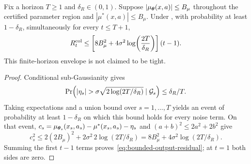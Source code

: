 \begin{lemma}
\label{lem:bounded-output-residual}
Fix a horizon $T\ge1$ and $\delta_R\in(0,1)$.  Suppose
$|\mu_{\boldsymbol{\theta}}(x,a)|\le B_\mu$ throughout the certified parameter region and
$|\mu^*(x,a)|\le B_\mu$.  Under , with probability at least
$1-\delta_R$, simultaneously for every $t\le T+1$,
\begin{equation}\label{eq:bounded-output-residual}
 R_t^{\rm col}\le
 \left[8B_\mu^2+4\sigma^2\log\!\left(\frac{2T}{\delta_R}\right)\right](t-1).
\end{equation}
This finite-horizon envelope is not claimed to be tight.
\end{lemma}
\begin{proof}
Conditional sub-Gaussianity gives
\[
 \Pr\!\left(|\eta_s|>
 \sigma\sqrt{2\log(2T/\delta_R)}\mid\cG_s\right)
 \le\delta_R/T.
\]
Taking expectations and a union bound over $s=1,\ldots,T$ yields an event of
probability at least $1-\delta_R$ on which this bound holds for every noise
term.  On that event,
$c_s=\mu_{\boldsymbol{\theta}_s}(x_s,a_s)-\mu^*(x_s,a_s)-\eta_s$ and
$(a+b)^2\le2a^2+2b^2$ give
\[
 c_s^2\le
 2(2B_\mu)^2+2\sigma^2\,2\log(2T/\delta_R)
 =8B_\mu^2+4\sigma^2\log(2T/\delta_R).
\]
Summing the first $t-1$ terms proves~\eqref{eq:bounded-output-residual}; at
$t=1$ both sides are zero.
\end{proof}

